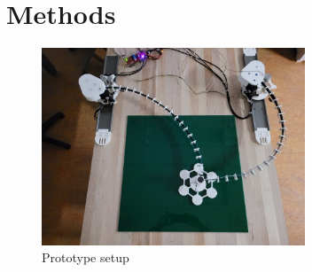 \pagebreak
\section{Methods}
\label{sec:methods}

\begin{figure}[H]
    \centering
    \includegraphics[width=0.7\textwidth]{images/current_setup.jpeg}
    \caption{Prototype setup}
    \label{fig:prototype}
\end{figure}

